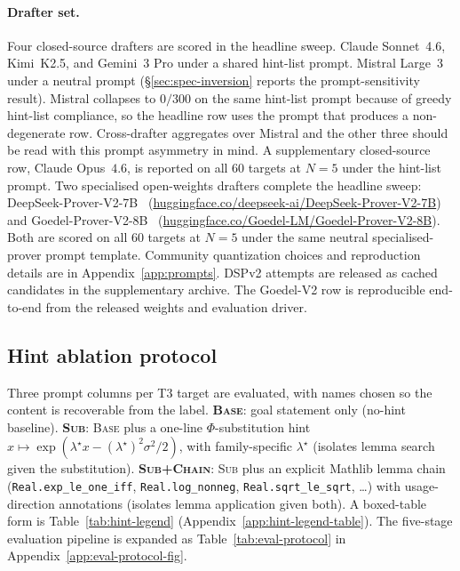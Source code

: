 \paragraph{Drafter set.}
Four closed-source drafters are scored in the headline sweep.
Claude Sonnet~4.6, Kimi~K2.5, and Gemini~3 Pro under a shared
hint-list prompt. Mistral Large~3 under a neutral prompt
(\S\ref{sec:spec-inversion} reports the prompt-sensitivity
result). Mistral collapses to $0/300$ on the same hint-list
prompt because of greedy hint-list compliance, so the headline
row uses the prompt that produces a non-degenerate row.
Cross-drafter aggregates over Mistral and the other three
should be read with this prompt asymmetry in mind. A
supplementary closed-source row, Claude Opus~$4.6$, is reported
on all $60$ targets at $N=5$ under the hint-list prompt.
Two specialised open-weights drafters complete the headline sweep:
DeepSeek-Prover-V2-7B~\cite{dspv22025}
(\href{https://huggingface.co/deepseek-ai/DeepSeek-Prover-V2-7B}{huggingface.co/deepseek-ai/DeepSeek-Prover-V2-7B})
and Goedel-Prover-V2-8B~\cite{goedelprover2025}
(\href{https://huggingface.co/Goedel-LM/Goedel-Prover-V2-8B}{huggingface.co/Goedel-LM/Goedel-Prover-V2-8B}).
Both are scored on all $60$ targets at $N=5$ under the same neutral
specialised-prover prompt template. Community quantization choices
and reproduction details are in Appendix~\ref{app:prompts}. DSPv2
attempts are released as cached candidates in the supplementary
archive. The Goedel-V2 row is reproducible end-to-end from the
released weights and evaluation driver.

\subsection{Hint ablation protocol}
\label{sec:methods-hint-ablation}

Three prompt columns per T3 target are evaluated, with names chosen
so the content is recoverable from the label.
\textbf{\textsc{Base}}: goal statement only (no-hint baseline).
\textbf{\textsc{Sub}}: \textsc{Base} plus a one-line
$\Phi$-substitution hint
$x \mapsto \exp(\lambda^{\star} x - (\lambda^{\star})^{2}\sigma^{2}/2)$,
with family-specific $\lambda^{\star}$ (isolates lemma search given
the substitution). \textbf{\textsc{Sub+Chain}}: \textsc{Sub} plus an
explicit Mathlib lemma chain (\texttt{Real.exp\_le\_one\_iff},
\texttt{Real.log\_nonneg}, \texttt{Real.sqrt\_le\_sqrt}, \dots) with
usage-direction annotations (isolates lemma application given both).
A boxed-table form is Table~\ref{tab:hint-legend}
(Appendix~\ref{app:hint-legend-table}). The five-stage evaluation
pipeline is expanded as Table~\ref{tab:eval-protocol}
in Appendix~\ref{app:eval-protocol-fig}.


